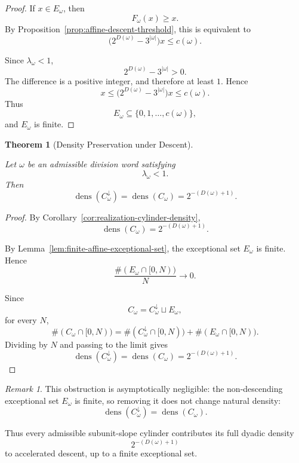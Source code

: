 \documentclass[12pt, oneside]{article}
\numberwithin{equation}{section}
\theoremstyle{definition}
\theoremstyle{plain}
\newtheorem{theorem}{Theorem}[section]
\theoremstyle{remark}
\newtheorem*{remark}{Remark}
\begin{document}
\begin{proof}
If \(x\in E_\omega\), then
\[
F_\omega(x)\ge x.
\]
By Proposition~\ref{prop:affine-descent-threshold}, this is equivalent to
\[
\bigl(2^{D(\omega)}-3^{|\omega|}\bigr)x
\le
c(\omega).
\]

Since \(\lambda_\omega<1\),
\[
2^{D(\omega)}-3^{|\omega|}>0.
\]
The difference is a positive integer, and therefore at least \(1\). Hence
\[
x
\le
\bigl(2^{D(\omega)}-3^{|\omega|}\bigr)x
\le
c(\omega).
\]
Thus
\[
E_\omega
\subseteq
\{0,1,\dots,c(\omega)\},
\]
and \(E_\omega\) is finite.
\end{proof}

\begin{theorem}[Density Preservation under Descent]
\label{thm:density-preservation-eventual-descent}

Let \(\omega\) be an admissible division word satisfying
\[
\lambda_\omega<1.
\]
Then
\[
\operatorname{dens}(C_\omega^\downarrow)
=
\operatorname{dens}(C_\omega)
=
2^{-(D(\omega)+1)}.
\]
\end{theorem}

\begin{proof}
By Corollary~\ref{cor:realization-cylinder-density},
\[
\operatorname{dens}(C_\omega)
=
2^{-(D(\omega)+1)}.
\]

By Lemma~\ref{lem:finite-affine-exceptional-set}, the exceptional set
\(E_\omega\) is finite. Hence
\[
\frac{\#(E_\omega\cap[0,N))}{N}
\longrightarrow0.
\]

Since
\[
C_\omega
=
C_\omega^\downarrow
\sqcup
E_\omega,
\]
for every \(N\),
\[
\#(C_\omega\cap[0,N))
=
\#(C_\omega^\downarrow\cap[0,N))
+
\#(E_\omega\cap[0,N)).
\]
Dividing by \(N\) and passing to the limit gives
\[
\operatorname{dens}(C_\omega^\downarrow)
=
\operatorname{dens}(C_\omega)
=
2^{-(D(\omega)+1)}.
\]
\end{proof}

\begin{remark}
This obstruction is asymptotically negligible: the non-descending
exceptional set \(E_\omega\) is finite, so removing it does not change
natural density:
\[
\operatorname{dens}(C_\omega^\downarrow)
=
\operatorname{dens}(C_\omega).
\]

Thus every admissible subunit-slope cylinder contributes its full dyadic
density
\[
2^{-(D(\omega)+1)}
\]
to accelerated descent, up to a finite exceptional set.
\end{remark}
\end{document}
